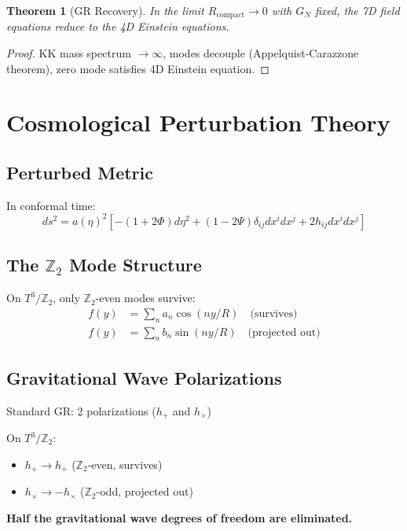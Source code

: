 \documentclass[11pt,a4paper]{article}
\theoremstyle{plain}
\newtheorem{theorem}{Theorem}[section]
\theoremstyle{definition}
\theoremstyle{remark}
\newcommand{\Ztwo}{\mathbb{Z}_2}
\begin{document}
\begin{theorem}[GR Recovery]
In the limit $R_{\text{compact}} \to 0$ with $G_N$ fixed, the 7D field equations reduce to the 4D Einstein equations.
\end{theorem}

\begin{proof}
KK mass spectrum $\to \infty$, modes decouple (Appelquist-Carazzone theorem), zero mode satisfies 4D Einstein equation.
\end{proof}

\section{Cosmological Perturbation Theory}

\subsection{Perturbed Metric}

In conformal time:
\[
ds^2 = a(\eta)^2 \left[ -(1+2\Phi)d\eta^2 + (1-2\Psi)\delta_{ij}dx^i dx^j + 2h_{ij}dx^i dx^j \right]
\]

\subsection{The $\Ztwo$ Mode Structure}

On $T^3/\Ztwo$, only $\Ztwo$-even modes survive:
\begin{align}
f(y) &= \sum_n a_n \cos(ny/R) \quad \text{(survives)} \\
f(y) &= \sum_n b_n \sin(ny/R) \quad \text{(projected out)}
\end{align}

\subsection{Gravitational Wave Polarizations}

Standard GR: 2 polarizations ($h_+$ and $h_\times$)

On $T^3/\Ztwo$:
\begin{itemize}
  \item $h_+ \to h_+$ ($\Ztwo$-even, survives)
  \item $h_\times \to -h_\times$ ($\Ztwo$-odd, projected out)
\end{itemize}
\textbf{Half the gravitational wave degrees of freedom are eliminated.}
\end{document}
